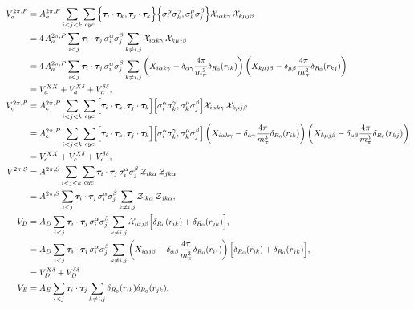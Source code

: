 \documentclass[aps,prc,twocolumn,superscriptaddress,floatfix]{revtex4-1}
\begin{document}
\begin{widetext}
\begin{align}
V_a^{2\pi,P}&=A_a^{2\pi,P}\sum_{i<j<k}\sum_{cyc}\Big\{\bm{\tau}_i\cdot\bm{\tau}_k,\bm{\tau}_j\cdot\bm{\tau}_k\Big\}
\Big\{\sigma_i^\alpha\sigma_k^\gamma,\sigma_k^\mu\sigma_j^\beta\Big\}
{\cal X}_{i\alpha k\gamma}\,{\cal X}_{k\mu j\beta}
\nonumber \\
&=4\,A_a^{2\pi,P}\sum_{i<j}\bm{\tau}_i\cdot\bm{\tau}_j\,\sigma_i^\alpha\sigma_j^\beta
\sum_{k\neq i,j}{\cal X}_{i\alpha k\gamma}\,{\cal X}_{k\mu j\beta} 
\nonumber \\
&=4\,A_a^{2\pi,P}\sum_{i<j}\bm{\tau}_i\cdot\bm{\tau}_j\,\sigma_i^\alpha\sigma_j^\beta
\sum_{k\neq i,j}\left(X_{i\alpha k\gamma}-\delta_{\alpha\gamma}\frac{4\pi}{m_\pi^3}\delta_{R_0}(r_{ik})\right)
\left(X_{k\mu j\beta}-\delta_{\mu\beta}\frac{4\pi}{m_\pi^3}\delta_{R_0}(r_{kj})\right)
\nonumber \\
&=V_a^{XX}+V_a^{X\delta}+V_a^{\delta\delta} ,
\label{eq:anti}
\\
V_c^{2\pi,P}&=A_c^{2\pi,P}\sum_{i<j<k}\sum_{cyc}\Big[\bm{\tau}_i\cdot\bm{\tau}_k,\bm{\tau}_j\cdot\bm{\tau}_k\Big]
\Big[\sigma_i^\alpha\sigma_k^\gamma,\sigma_k^\mu\sigma_j^\beta\Big]
{\cal X}_{i\alpha k\gamma}\,{\cal X}_{k\mu j\beta}
\nonumber \\
&=A_c^{2\pi,P}\sum_{i<j<k}\sum_{cyc}\Big[\bm{\tau}_i\cdot\bm{\tau}_k,\bm{\tau}_j\cdot\bm{\tau}_k\Big]
\Big[\sigma_i^\alpha\sigma_k^\gamma,\sigma_k^\mu\sigma_j^\beta\Big]
\left(X_{i\alpha k\gamma}-\delta_{\alpha\gamma}\frac{4\pi}{m_\pi^3}\delta_{R_0}(r_{ik})\right)
\left(X_{k\mu j\beta}-\delta_{\mu\beta}\frac{4\pi}{m_\pi^3}\delta_{R_0}(r_{kj})\right) 
\nonumber \\
&=V_c^{XX}+V_c^{X\delta}+V_c^{\delta\delta} ,
\label{eq:comm}
\\
V^{2\pi,S}&=A^{2\pi,S}\sum_{i<j<k}\sum_{cyc}
\bm{\tau}_i\cdot\bm{\tau}_j\,\sigma_i^\alpha\sigma_j^\beta\,{\cal Z}_{ik\alpha}\,{\cal Z}_{jk\alpha}
\nonumber \\
&=A^{2\pi,S}\sum_{i<j}\bm{\tau}_i\cdot\bm{\tau}_j\,\sigma_i^\alpha\sigma_j^\beta
\sum_{k\neq i,j}{\cal Z}_{ik\alpha}\,{\cal Z}_{jk\alpha} ,
\label{eq:tm}
\\
V_D&=A_D\sum_{i<j}\bm{\tau}_i\cdot\bm{\tau}_j\,\sigma_i^\alpha\sigma_j^\beta
\sum_{k\neq i,j}{\cal X}_{i\alpha j\beta}\Big[\delta_{R_0}(r_{ik})+\delta_{R_0}(r_{jk})\Big] , 
\nonumber \\
&=A_D\sum_{i<j}\bm{\tau}_i\cdot\bm{\tau}_j\,\sigma_i^\alpha\sigma_j^\beta
\sum_{k\neq i,j}\left(X_{i\alpha j\beta}-\delta_{\alpha\beta}\frac{4\pi}{m_\pi^3}\delta_{R_0}(r_{ij})\right) \Big[\delta_{R_0}(r_{ik})+\delta_{R_0}(r_{jk})\Big] , 
\nonumber \\
&=V_D^{X\delta}+V_D^{\delta\delta}
\label{eq:vd}
\\
V_E&=A_E\sum_{i<j}\bm{\tau}_i\cdot\bm{\tau}_j\sum_{k\neq i,j}\delta_{R_0}(r_{ik})\delta_{R_0}(r_{jk}) ,
\label{eq:ve}
\end{align}
\end{widetext}
\end{document}
